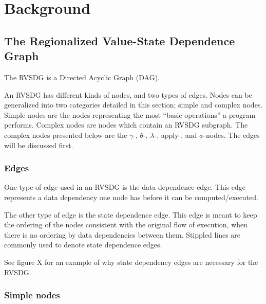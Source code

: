 
\clearpage
\section{Background}
\label{background}

\subsection{The Regionalized Value-State Dependence Graph}
\label{background:RVSDG}

The RVSDG is a Directed Acyclic Graph (DAG).

An RVSDG has different kinds of nodes, and two types of edges. Nodes can be
generalized into two categories detailed in this section; simple and complex
nodes. Simple nodes are the nodes representing the most ``basic operations'' a
program performs. Complex nodes are nodes which contain an RVSDG subgraph. The
complex nodes presented below are the $\gamma$-, $\theta$-, $\lambda$-, apply-,
and $\phi$-nodes. The edges will be discussed first.


\subsubsection{Edges}

One type of edge used in an RVSDG is the data dependence edge. This edge
represents a data dependency one node has before it can be computed/executed.

The other type of edge is the state dependence edge. This edge is meant to keep
the ordering of the nodes consistent with the original flow of execution, when
there is no ordering by data dependencies between them. Stippled lines are
commonly used to denote state dependence edges.

See figure X for an example of why state dependency edges are necessary for the
RVSDG.

\subsubsection{Simple nodes}


